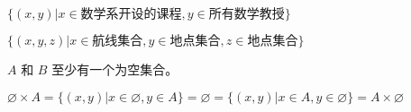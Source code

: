 {{        %
        \begin{practices}
            $\{(x, y) | x \in \text{数学系开设的课程}, y \in \text{所有数学教授}\}$
        \end{practices}

        \begin{practices}
            $\{(x, y, z) | x \in \text{航线集合}, y \in \text{地点集合}, z \in \text{地点集合}\}$
        \end{practices}

        \begin{practices}
            $A$ 和 $B$ 至少有一个为空集合。
        \end{practices}

        \begin{practices}
            $\varnothing \times A = \{(x, y) | x \in \varnothing, y \in A\} = \varnothing = \{(x, y) | x \in A, y \in \varnothing\} = A \times \varnothing$
        \end{practices}

}}
